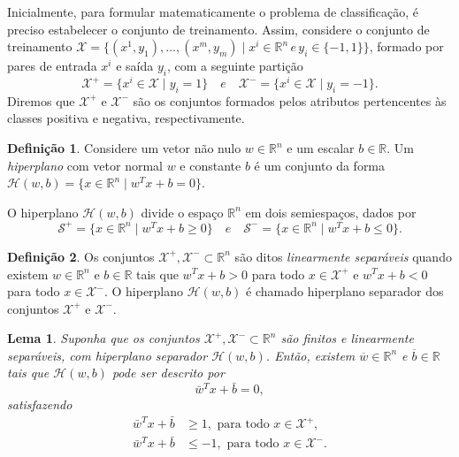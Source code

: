 \documentclass[12pt,a4paper]{scrartcl}
\def\Xset{\mathcal{X}}
\def\Hset{\mathcal{H}}
\def\RR{\mathds{R}}
\def\wbar{\bar{w}}
\def\bbar{\bar{b}}
\newtheorem{lema}{Lema}
\theoremstyle{definition}%
\newtheorem{defi}{Definição}
\begin{document}
Inicialmente, para formular matematicamente o problema de classificação, é preciso estabelecer o conjunto de treinamento. Assim, considere o conjunto de treinamento $\Xset=\{(x^1, y_1), \ldots , (x^m, y_m)\mid x^i \in \RR^{n} \, e \, y_i \in \{-1,1\}\}$, formado por pares de entrada $x^{i}$ e saída $y_{i}$, com a seguinte partição 
\[ \label{conj1}
\Xset ^{+} =\{x^i \in \Xset\mid y_i=1\} \quad e \quad \Xset^{-}=\{x^i \in \Xset\mid y_i=-1\}.
\]
Diremos que $\Xset ^{+}$ e $\Xset^{-}$ são os conjuntos formados pelos atributos pertencentes às classes positiva e negativa, respectivamente.

\begin{defi} Considere um vetor não nulo $w\in \RR^n$ e um escalar $b\in \RR$. Um \emph{hiperplano} com vetor normal $w$ e constante $b$ é um conjunto da forma $\Hset(w,b)=\{x\in \RR^n \mid w^{T}x+b=0\}$.
\end{defi}

O hiperplano $\Hset(w,b)$ divide o espaço $\RR^n$ em dois semiespaços, dados por
\[ \label{conj2}
\mathcal{S}^{+}=\{x\in \RR^n \mid w^{T}x+b\geq 0\} \quad e \quad \mathcal{S}^{-}=\{x\in \RR^n \mid w^{T}x+b\leq 0\}.
\]


\begin{defi} \label{def:dados_linearmente_separaveis} Os conjuntos $\Xset^{+}, \Xset^{-} \subset \RR^n$ são ditos \emph{linearmente separáveis} quando existem $w\in \RR^n$ e $b\in \RR$  tais que $w^{T}x+b>0$ para todo $x\in \Xset^{+}$ e $w^{T}x+b<0$ para todo $x\in \Xset^{-}$. O hiperplano $\Hset(w,b)$ é chamado hiperplano separador dos conjuntos $\Xset^{+}$ e $\Xset^{-}$.
\end{defi}

\begin{lema} \label{lema:hiperplanos_separadores} 
Suponha que os conjuntos $\Xset^{+}, \Xset^{-} \subset \RR^n$ são finitos e linearmente separáveis, com hiperplano separador $\Hset(w,b)$. Então, existem $\overline{w}\in \RR^n$ e $\overline{b}\in \RR$ tais que $\Hset(w,b)$ pode ser descrito por
\[
\wbar^{T}x+\bbar =0,
\]
satisfazendo
\begin{align}
\wbar^{T}x+\bbar &\geq 1, \text{ para todo } x\in \Xset^{+}, \label{eq:1_hiperplanos_separadores} \\
\wbar^{T}x+\bbar &\leq -1, \text{ para todo } x\in \Xset^{-}. \label{eq:2_hiperplanos_separadores}
\end{align}
\end{lema} 
\end{document}
